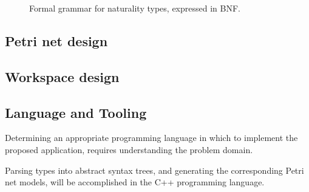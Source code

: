 \documentclass[../Dissertation.tex]{subfiles}
\begin{document}
\begin{figure}[H]

\caption{Formal grammar for naturality types, expressed in BNF.}
\label{fig:natgrammar}
\end{figure}

\subsection{Petri net design}\label{sec:petrinetdesign}
\subsection{Workspace design}\label{sec:workspacedesign}

\subsection{Language and Tooling}
Determining an appropriate programming language in which to implement the proposed application, requires understanding the problem domain. 
\par
Parsing types into abstract syntax trees, and generating the corresponding Petri net models, will be accomplished in the C++ programming language.
\par
\end{document}
